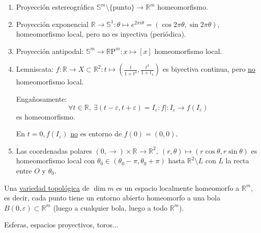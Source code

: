\begin{ej}[¡Importantes!]
\begin{enumerate}
    \item Proyección estereográfica $\mathbb{S}^{m} \setminus \{\text{punto}\} \rightarrow \mathbb{R}^m$ homeomorfismo.
    \item Proyección exponencial $\mathbb{R} \rightarrow \mathbb{S}^1: \theta \mapsto e^{2\pi i\theta} = \left( \cos 2\pi \theta, \sin 2\pi \theta \right)$, homeomorfismo local, pero no es inyectiva (periódica).
    \item Proyección antipodal: $\mathbb{S}^m \rightarrow \mathbb{R}\mathrm{P}^{m}: x \mapsto \left[ x \right]$ homeomorfismo local.
    \item Lemniscata: $f: \mathbb{R} \rightarrow X \subset \mathbb{R}^2: t \mapsto \left( \frac{t}{1 + t^4}, \frac{t^3}{1 + t_4} \right)$ es biyectiva continua, pero \underline{no} homeomorfismo local.

    Engañosamente: 
    \[
        \forall t \in \mathbb{R},\ \exists \left( t - \varepsilon, t + \varepsilon \right) = I_{\varepsilon}: f| : I_{\varepsilon} \rightarrow f\left( I_{\varepsilon} \right) 
    \]
    es homeomorfismo.

    En $t = 0, f\left( I_{\varepsilon} \right)$ \underline{no} es entorno de $f\left( 0 \right) = \left( 0, 0 \right)$.

    \item Las coordenadas polares $\left( 0, \rightarrow \right) \times \mathbb{R}^{} \rightarrow \mathbb{R}^{2},\ \left( r, \theta \right) \mapsto \left( r\cos \theta, r \sin \theta \right)$ es homeomorfismo local con $\theta_0 \in \left( \theta_0 - \pi, \theta_0 + \pi \right)$ hasta $\mathbb{R}^{2} \setminus L$ con $L$ la recta entre $O$ y $\theta_0$.
\end{enumerate} 
\end{ej}

\begin{defi}
Una \underline{variedad topológica} de $\dim m$ es un espacio localmente homeomorfo a $\mathbb{R}^m$, es decir, cada punto tiene un entorno abierto homeomorfo a una bola $B\left( 0, \varepsilon \right) \subset \mathbb{R}^m$ (luego a cualquier bola, luego a todo $\mathbb{R}^m$).
\end{defi}
\begin{ej}
Esferas, espacios proyectivos, toros...
\end{ej}


